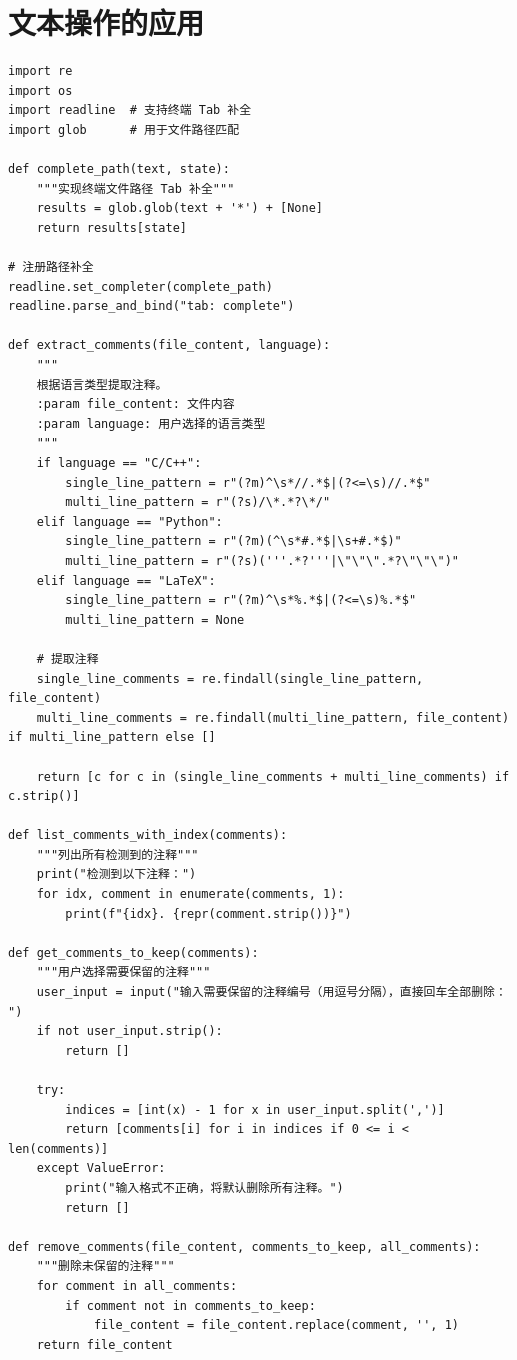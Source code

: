\chapter{文本操作的应用}
\begin{lstlisting}[style=pythonstyle, title={删除文本注释.py}]
import re
import os
import readline  # 支持终端 Tab 补全
import glob      # 用于文件路径匹配

def complete_path(text, state):
    """实现终端文件路径 Tab 补全"""
    results = glob.glob(text + '*') + [None]
    return results[state]

# 注册路径补全
readline.set_completer(complete_path)
readline.parse_and_bind("tab: complete")

def extract_comments(file_content, language):
    """
    根据语言类型提取注释。
    :param file_content: 文件内容
    :param language: 用户选择的语言类型
    """
    if language == "C/C++":
        single_line_pattern = r"(?m)^\s*//.*$|(?<=\s)//.*$"
        multi_line_pattern = r"(?s)/\*.*?\*/"
    elif language == "Python":
        single_line_pattern = r"(?m)(^\s*#.*$|\s+#.*$)"
        multi_line_pattern = r"(?s)('''.*?'''|\"\"\".*?\"\"\")"
    elif language == "LaTeX":
        single_line_pattern = r"(?m)^\s*%.*$|(?<=\s)%.*$"
        multi_line_pattern = None

    # 提取注释
    single_line_comments = re.findall(single_line_pattern, file_content)
    multi_line_comments = re.findall(multi_line_pattern, file_content) if multi_line_pattern else []

    return [c for c in (single_line_comments + multi_line_comments) if c.strip()]

def list_comments_with_index(comments):
    """列出所有检测到的注释"""
    print("检测到以下注释：")
    for idx, comment in enumerate(comments, 1):
        print(f"{idx}. {repr(comment.strip())}")

def get_comments_to_keep(comments):
    """用户选择需要保留的注释"""
    user_input = input("输入需要保留的注释编号（用逗号分隔），直接回车全部删除： ")
    if not user_input.strip():
        return []

    try:
        indices = [int(x) - 1 for x in user_input.split(',')]
        return [comments[i] for i in indices if 0 <= i < len(comments)]
    except ValueError:
        print("输入格式不正确，将默认删除所有注释。")
        return []

def remove_comments(file_content, comments_to_keep, all_comments):
    """删除未保留的注释"""
    for comment in all_comments:
        if comment not in comments_to_keep:
            file_content = file_content.replace(comment, '', 1)
    return file_content


\end{lstlisting}
